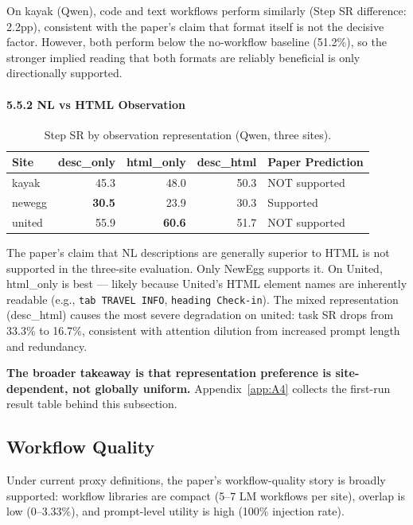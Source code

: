 \documentclass{article}
\begin{document}
On kayak (Qwen), code and text workflows perform similarly (Step SR
difference: 2.2pp), consistent with the paper's claim that format itself
is not the decisive factor. However, both perform below the no-workflow
baseline (51.2\%), so the stronger implied reading that both formats are
reliably beneficial is only directionally supported.

\paragraph{5.5.2 NL vs HTML Observation}\label{nl-vs-html-observation}

{\begin{longtable}[]{@{}lrrrl@{}}
\caption{Step SR by observation representation (Qwen, three sites).}\label{tab:step-sr-by-observation-representation-qwen-th}\\

\toprule\noalign{}
Site & desc\_only & html\_only & desc\_html & Paper Prediction \\
\midrule\noalign{}
\endhead
\bottomrule\noalign{}
\endlastfoot
kayak & 45.3 & 48.0 & 50.3 & NOT supported \\
newegg & \textbf{30.5} & 23.9 & 30.3 & Supported \\
united & 55.9 & \textbf{60.6} & 51.7 & NOT supported \\
\end{longtable}
}

The paper's claim that NL descriptions are generally superior to HTML is
not supported in the three-site evaluation. Only NewEgg supports it. On
United, html\_only is best --- likely because United's HTML element
names are inherently readable (e.g., \texttt{tab\ TRAVEL\ INFO},
\texttt{heading\ Check-in}). The mixed representation (desc\_html)
causes the most severe degradation on united: task SR drops from 33.3\%
to 16.7\%, consistent with attention dilution from increased prompt
length and redundancy.

\textbf{The broader takeaway is that representation preference is
site-dependent, not globally uniform.} Appendix~\ref{app:A4} collects
the first-run result table behind this subsection.

\subsection{Workflow Quality}\label{c5-workflow-quality}

Under current proxy definitions, the paper's workflow-quality story is
broadly supported: workflow libraries are compact (5--7 LM workflows per
site), overlap is low (0--3.33\%), and prompt-level utility is high
(100\% injection rate).
\end{document}
